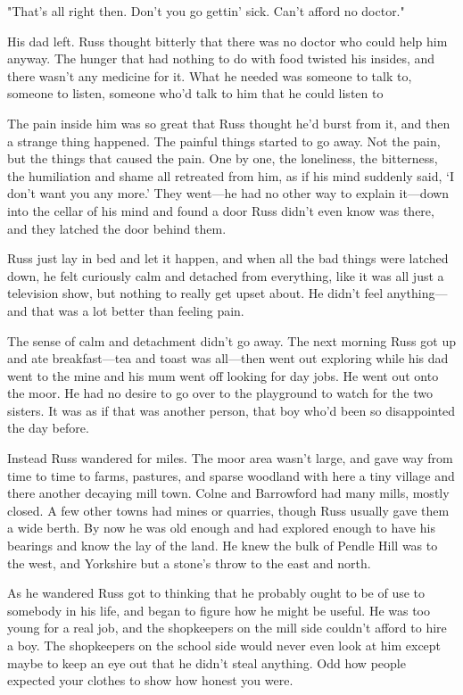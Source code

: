 "That's all right then. Don't you go gettin' sick. Can't afford no doctor."

His dad left. Russ thought bitterly that there was no doctor who could help him anyway. The hunger that had nothing to do with food twisted his insides, and there wasn't any medicine for it. What he needed was someone to talk to, someone to listen, someone who'd talk to him that he could listen to{\el}

The pain inside him was so great that Russ thought he'd burst from it, and then a strange thing happened. The painful things started to go away. Not the pain, but the things that caused the pain. One by one, the loneliness, the bitterness, the humiliation and shame all retreated from him, as if his mind suddenly said, `I don't want you any more.' They went—he had no other way to explain it—down into the cellar of his mind and found a door Russ didn't even know was there, and they latched the door behind them.

Russ just lay in bed and let it happen, and when all the bad things were latched down, he felt curiously calm and detached from everything, like it was all just a television show, but nothing to really get upset about. He didn't feel anything—and that was a lot better than feeling pain.

The sense of calm and detachment didn't go away. The next morning Russ got up and ate breakfast—tea and toast was all—then went out exploring while his dad went to the mine and his mum went off looking for day jobs. He went out onto the moor. He had no desire to go over to the playground to watch for the two sisters. It was as if that was another person, that boy who'd been so disappointed the day before.

Instead Russ wandered for miles. The moor area wasn't large, and gave way from time to time to farms, pastures, and sparse woodland with here a tiny village and there another decaying mill town. Colne and Barrowford had many mills, mostly closed. A few other towns had mines or quarries, though Russ usually gave them a wide berth. By now he was old enough and had explored enough to have his bearings and know the lay of the land. He knew the bulk of Pendle Hill was to the west, and Yorkshire but a stone's throw to the east and north.

As he wandered Russ got to thinking that he probably ought to be of use to somebody in his life, and began to figure how he might be useful. He was too young for a real job, and the shopkeepers on the mill side couldn't afford to hire a boy. The shopkeepers on the school side would never even look at him except maybe to keep an eye out that he didn't steal anything. Odd how people expected your clothes to show how honest you were.

